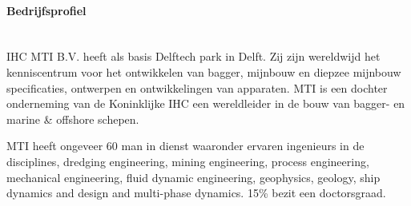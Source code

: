 \documentclass[a4paper,11pt]{../LatexDocStructures/MTItexMemo} %
\begin{document}
\paragraph{Bedrijfsprofiel}\mbox{} \\
IHC MTI B.V. heeft als basis Delftech park in Delft. Zij zijn wereldwijd het kenniscentrum voor het ontwikkelen van bagger, mijnbouw en diepzee mijnbouw specificaties, ontwerpen en ontwikkelingen van apparaten. MTI is een dochter onderneming van de Koninklijke IHC een wereldleider in de bouw van bagger- en marine \& offshore schepen.

MTI heeft ongeveer 60 man in dienst waaronder ervaren ingenieurs in de disciplines, dredging engineering, mining engineering, process engineering, mechanical engineering, fluid dynamic engineering, geophysics, geology, ship dynamics and design and multi-phase dynamics. 15\% bezit een doctorsgraad.

\end{document}
